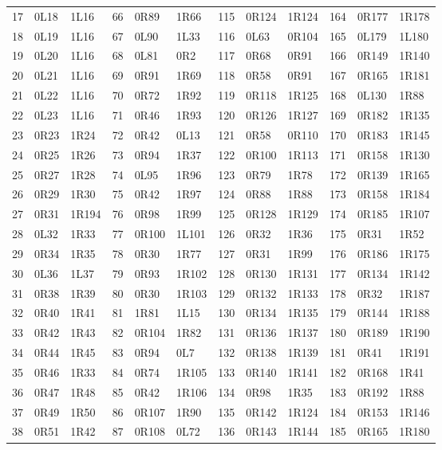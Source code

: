 \begin{center}
\begin{tabular}{rll@{\hspace{1.2em}}rll@{\hspace{1.2em}}rll@{\hspace{1.2em}}rll}
17 & 0L18 & 1L16 & 66 & 0R89 & 1R66 & 115 & 0R124 & 1R124 & 164 & 0R177 & 1R178\\
18 & 0L19 & 1L16 & 67 & 0L90 & 1L33 & 116 & 0L63 & 0R104 & 165 & 0L179 & 1L180\\
19 & 0L20 & 1L16 & 68 & 0L81 & 0R2 & 117 & 0R68 & 0R91 & 166 & 0R149 & 1R140\\
20 & 0L21 & 1L16 & 69 & 0R91 & 1R69 & 118 & 0R58 & 0R91 & 167 & 0R165 & 1R181\\
21 & 0L22 & 1L16 & 70 & 0R72 & 1R92 & 119 & 0R118 & 1R125 & 168 & 0L130 & 1R88\\
22 & 0L23 & 1L16 & 71 & 0R46 & 1R93 & 120 & 0R126 & 1R127 & 169 & 0R182 & 1R135\\
23 & 0R23 & 1R24 & 72 & 0R42 & 0L13 & 121 & 0R58 & 0R110 & 170 & 0R183 & 1R145\\
24 & 0R25 & 1R26 & 73 & 0R94 & 1R37 & 122 & 0R100 & 1R113 & 171 & 0R158 & 1R130\\
25 & 0R27 & 1R28 & 74 & 0L95 & 1R96 & 123 & 0R79 & 1R78 & 172 & 0R139 & 1R165\\
26 & 0R29 & 1R30 & 75 & 0R42 & 1R97 & 124 & 0R88 & 1R88 & 173 & 0R158 & 1R184\\
27 & 0R31 & 1R194 & 76 & 0R98 & 1R99 & 125 & 0R128 & 1R129 & 174 & 0R185 & 1R107\\
28 & 0L32 & 1R33 & 77 & 0R100 & 1L101 & 126 & 0R32 & 1R36 & 175 & 0R31 & 1R52\\
29 & 0R34 & 1R35 & 78 & 0R30 & 1R77 & 127 & 0R31 & 1R99 & 176 & 0R186 & 1R175\\
30 & 0L36 & 1L37 & 79 & 0R93 & 1R102 & 128 & 0R130 & 1R131 & 177 & 0R134 & 1R142\\
31 & 0R38 & 1R39 & 80 & 0R30 & 1R103 & 129 & 0R132 & 1R133 & 178 & 0R32 & 1R187\\
32 & 0R40 & 1R41 & 81 & 1R81 & 1L15 & 130 & 0R134 & 1R135 & 179 & 0R144 & 1R188\\
33 & 0R42 & 1R43 & 82 & 0R104 & 1R82 & 131 & 0R136 & 1R137 & 180 & 0R189 & 1R190\\
34 & 0R44 & 1R45 & 83 & 0R94 & 0L7 & 132 & 0R138 & 1R139 & 181 & 0R41 & 1R191\\
35 & 0R46 & 1R33 & 84 & 0R74 & 1R105 & 133 & 0R140 & 1R141 & 182 & 0R168 & 1R41\\
36 & 0R47 & 1R48 & 85 & 0R42 & 1R106 & 134 & 0R98 & 1R35 & 183 & 0R192 & 1R88\\
37 & 0R49 & 1R50 & 86 & 0R107 & 1R90 & 135 & 0R142 & 1R124 & 184 & 0R153 & 1R146\\
38 & 0R51 & 1R42 & 87 & 0R108 & 0L72 & 136 & 0R143 & 1R144 & 185 & 0R165 & 1R180\\

\end{tabular}
\end{center}
